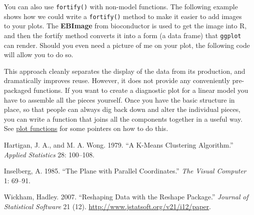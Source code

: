 You can also use \texttt{fortify()} with non-model functions. The
following example shows how we could write a \texttt{fortify()} method
to make it easier to add images to your plots. The \textbf{EBImage} from
bioconductor is used to get the image into R, and then the fortify
method converts it into a form (a data frame) that \texttt{ggplot} can
render. Should you even need a picture of me on your plot, the following
code will allow you to do so. 

\begin{Shaded}
\begin{Highlighting}[]
\NormalTok{(}\NormalTok{)}
\StringTok{ }\NormalTok{()}
\NormalTok{(}
\StringTok{ }
\StringTok{ }\NormalTok{)}
\NormalTok{(}\NormalTok{:}\NormalTok{, }\NormalTok{:}\NormalTok{, } \NormalTok{) +}\StringTok{ }
\StringTok{  }
\end{Highlighting}
\end{Shaded}

This approach cleanly separates the display of the data from its
production, and dramatically improves reuse. However, it does not
provide any conveniently pre-packaged functions. If you want to create a
diagnostic plot for a linear model you have to assemble all the pieces
yourself. Once you have the basic structure in place, so that people can
always dig back down and alter the individual pieces, you can write a
function that joins all the components together in a useful way. See
\hyperref[sec:functions]{plot functions} for some pointers on how to do
this.

Hartigan, J. A., and M. A. Wong. 1979. ``A K-Means Clustering
Algorithm.'' \emph{Applied Statistics} 28: 100--108.

Inselberg, A. 1985. ``The Plane with Parallel Coordinates.'' \emph{The
Visual Computer} 1: 69--91.

Wickham, Hadley. 2007. ``Reshaping Data with the Reshape Package.''
\emph{Journal of Statistical Software} 21 (12).
\url{http://www.jstatsoft.org/v21/i12/paper}.
